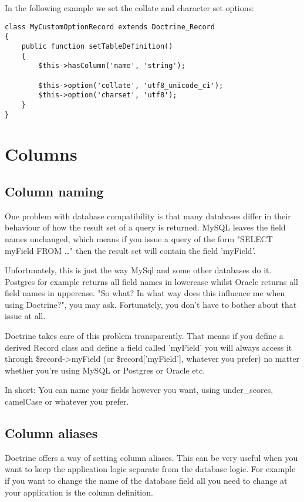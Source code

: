 \documentclass[11pt,a4paper]{report}
\begin{document}
In the following example we set the collate and character set options:

\begin{verbatim}
class MyCustomOptionRecord extends Doctrine_Record
{
    public function setTableDefinition()
    {
        $this->hasColumn('name', 'string');

        $this->option('collate', 'utf8_unicode_ci');
        $this->option('charset', 'utf8');
    }
}
\end{verbatim}

\section{Columns}
\subsection{Column naming}
One problem with database compatibility is that many databases differ in their behaviour of how the result set of a query is returned. MySQL leaves the field names unchanged, which means if you issue a query of the form "SELECT myField FROM \ldots" then the result set will contain the field 'myField'.

Unfortunately, this is just the way MySql and some other databases do it. Postgres for example returns all field names in lowercase whilst Oracle returns all field names in uppercase. "So what? In what way does this influence me when using Doctrine?", you may ask. Fortunately, you don't have to bother about that issue at all.

Doctrine takes care of this problem transparently. That means if you define a derived Record class and define a field called 'myField' you will always access it through \$record->myField (or \$record['myField'], whatever you prefer) no matter whether you're using MySQL or Postgres or Oracle etc.

In short: You can name your fields however you want, using under\_scores, camelCase or whatever you prefer.

\subsection{Column aliases}
Doctrine offers a way of setting column aliases. This can be very useful when you want to keep the application logic separate from the database logic. For example if you want to change the name of the database field all you need to change at your application is the column definition.
\end{document}
